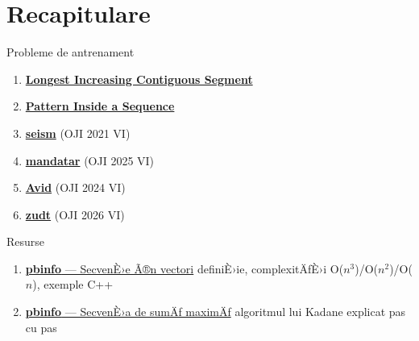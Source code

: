\documentclass{beamer}
\begin{document}
\section{Recapitulare}

\begin{frame}{Probleme de antrenament}
  \begin{enumerate}
    \item \href{https://code.algolymp.com/problems/4204}{\textbf{Longest Increasing Contiguous Segment}}
    \item \href{https://code.algolymp.com/problems/4205}{\textbf{Pattern Inside a Sequence}}
    \item \href{https://code.algolymp.com/problems/1929}{\textbf{seism}} (OJI 2021 VI)
    \item \href{https://code.algolymp.com/problems/3572}{\textbf{mandatar}} (OJI 2025 VI)
    \item \href{https://code.algolymp.com/problems/2996}{\textbf{Avid}} (OJI 2024 VI)
    \item \href{https://code.algolymp.com/problems/3853}{\textbf{zudt}} (OJI 2026 VI)
  \end{enumerate}
\end{frame}

\begin{frame}{Resurse}
  \begin{enumerate}
      \item \href{https://www.pbinfo.ro/articole/5613/secvente-in-vectori}{\textbf{pbinfo} --- SecvenÈ›e Ã®n vectori}
          \textemdash{} definiÈ›ie, complexitÄƒÈ›i O($n^3$)/O($n^2$)/O($n$), exemple C++
    \smallskip
    \item \href{https://www.pbinfo.ro/articole/20499/secventa-de-suma-maxima}{\textbf{pbinfo} --- SecvenÈ›a de sumÄƒ maximÄƒ}
          \textemdash{} algoritmul lui Kadane explicat pas cu pas
  \end{enumerate}
\end{frame}
\end{document}

